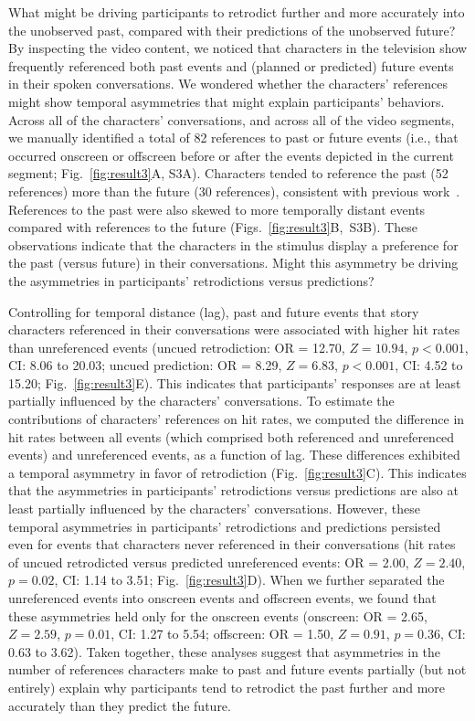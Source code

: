 \documentclass[10pt]{article}
\newcommand{\references}{S3}
\begin{document}
What might be driving participants to retrodict further and more accurately into the unobserved past, compared with their predictions of the unobserved future?  By inspecting the video content, we noticed that characters in the television show frequently referenced both past events and (planned or predicted) future events in their spoken conversations.  We wondered whether the characters' references might show temporal asymmetries that might explain participants' behaviors.  Across all of the characters' conversations, and across all of the video segments, we manually identified a total of 82 references to past or future events (i.e., that occurred onscreen or offscreen before or after the events depicted in the current segment; Fig.~\ref{fig:result3}A, \references A).  Characters tended to reference the past (52 references) more than the future (30 references), consistent with previous work~\citep{DemiEtal18}.  References to the past were also skewed to more temporally distant events compared with references to the future (Figs.~\ref{fig:result3}B,~\references B).  These observations indicate that the characters in the stimulus display a preference for the past (versus future) in their conversations.  Might this asymmetry be driving the asymmetries in participants' retrodictions versus predictions?

Controlling for temporal distance (lag), past and future events that story characters referenced in their conversations were associated with higher hit rates than unreferenced events (uncued retrodiction: OR = 12.70, $Z = 10.94$, $p < 0.001$, CI: 8.06 to 20.03; uncued prediction: OR = 8.29, $Z = 6.83$, $p < 0.001$, CI: 4.52 to 15.20; Fig.~\ref{fig:result3}E).  This indicates that participants' responses are at least partially influenced by the characters' conversations.  
To estimate the contributions of characters’ references on hit rates, we computed the difference in hit rates between all events (which comprised both referenced and unreferenced events) and unreferenced events, as a function of lag. 
These differences exhibited a temporal asymmetry in favor of retrodiction (Fig.~\ref{fig:result3}C).  
This indicates that the asymmetries in participants' retrodictions versus predictions are also at least partially influenced by the characters' conversations. 
However, these temporal asymmetries in participants' retrodictions and predictions persisted even for events that characters never referenced in their conversations (hit rates of uncued retrodicted versus predicted unreferenced events: OR = 2.00, $Z = 2.40$, $p = 0.02$, CI: 1.14 to 3.51; Fig.~\ref{fig:result3}D).  When we further separated the unreferenced events into onscreen events and offscreen events, we found that these asymmetries held only for the onscreen events (onscreen: OR = 2.65, $Z = 2.59$, $p = 0.01$, CI: 1.27 to 5.54; offscreen: OR = 1.50, $Z = 0.91$, $p = 0.36$, CI: 0.63 to 3.62).  Taken together, these analyses suggest that asymmetries in the number of references characters make to past and future events partially (but not entirely) explain why participants tend to retrodict the past further and more accurately than they predict the future.
\end{document}
